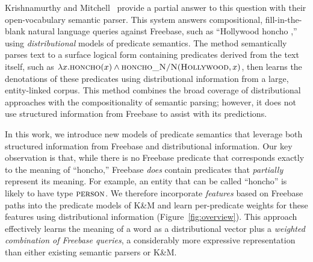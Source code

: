 \documentclass[11pt]{article}
\newcommand{\figref}[1]{Figure~\ref{fig:#1}}
\newcommand{\blank}{\underline{\hspace{.5cm}}}
\newcommand{\predicate}[1]{\ensuremath{\textsc{#1}}}
\newcommand{\entity}[1]{\ensuremath{\textsc{#1}}}
\begin{document}

Krishnamurthy and
Mitchell~
provide a partial answer to this question with their open-vocabulary
semantic parser. This system answers compositional, fill-in-the-blank
natural language queries against Freebase, such as ``Hollywood honcho
\blank{},'' using \emph{distributional} models of predicate
semantics. The method semantically parses text to a surface logical
form containing predicates derived from the text itself, such as
$\lambda x.\predicate{honcho}(x) \land
\predicate{honcho\_N/N}(\entity{Hollywood}, x)$, then learns the
denotations of these predicates using distributional information from
a large, entity-linked corpus. This method combines the broad coverage
of distributional approaches with the compositionality of semantic
parsing; however, it does not use structured information from Freebase
to assist with its predictions.

In this work, we introduce new models of predicate semantics that
leverage both structured information from Freebase and distributional
information. Our key observation is that, while there is no Freebase
predicate that corresponds exactly to the meaning of ``honcho,''
Freebase \emph{does} contain predicates that \emph{partially}
represent its meaning. For example, an entity that can be called
``honcho'' is likely to have type \predicate{person}. We therefore
incorporate \emph{features} based on Freebase paths into the predicate
models of K\&M and learn per-predicate weights for these features
using distributional information (\figref{overview}). This approach
effectively learns the meaning of a word as a distributional vector
plus a \emph{weighted combination of Freebase queries}, a considerably
more expressive representation than either existing semantic parsers
or K\&M.
\end{document}
